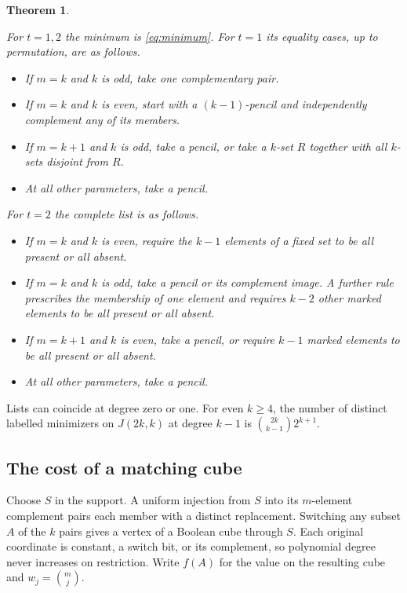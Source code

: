 \documentclass[11pt,letterpaper]{article}
\newtheorem{theorem}{Theorem}[section]
\numberwithin{equation}{section}
\begin{document}
\begin{theorem}\label{thm:high}

For $t=1,2$ the minimum is \eqref{eq:minimum}. For $t=1$ its equality cases, up to permutation, are as follows.

\begin{itemize}
\item If $m=k$ and $k$ is odd, take one complementary pair.
\item If $m=k$ and $k$ is even, start with a $(k-1)$-pencil and independently complement any of its members.
\item If $m=k+1$ and $k$ is odd, take a pencil, or take a $k$-set $R$ together with all $k$-sets disjoint from $R$.
\item At all other parameters, take a pencil.
\end{itemize}

For $t=2$ the complete list is as follows.

\begin{itemize}
\item If $m=k$ and $k$ is even, require the $k-1$ elements of a fixed set to be all present or all absent.
\item If $m=k$ and $k$ is odd, take a pencil or its complement image. A further rule prescribes the membership of one element and requires $k-2$ other marked elements to be all present or all absent.
\item If $m=k+1$ and $k$ is even, take a pencil, or require $k-1$ marked elements to be all present or all absent.
\item At all other parameters, take a pencil.
\end{itemize}
\end{theorem}

Lists can coincide at degree zero or one. For even $k\ge4$, the number of distinct labelled
minimizers on $J(2k,k)$ at degree $k-1$ is $\binom{2k}{k-1}2^{k+1}$.

\subsection{The cost of a matching cube}\label{sec:weighted}

Choose $S$ in the support. A uniform injection from $S$ into its $m$-element complement pairs
each member with a distinct replacement. Switching any subset $A$ of the $k$ pairs gives a
vertex of a Boolean cube through $S$. Each original coordinate is constant, a switch bit, or
its complement, so polynomial degree never increases on restriction. Write $f(A)$ for the
value on the resulting cube and $w_j=\binom mj$.
\end{document}
